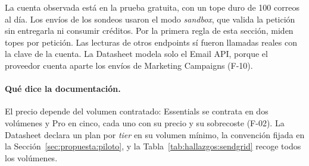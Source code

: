 La cuenta observada está en la prueba gratuita, con un tope duro de 100
correos al día. Los envíos de los sondeos usaron el modo \textit{sandbox}, que
valida la petición sin entregarla ni consumir créditos. Por la primera regla
de esta sección, miden topes por petición. Las lecturas de otros endpoints sí fueron
llamadas reales con la clave de la cuenta. La Datasheet modela solo el Email
API, porque el proveedor cuenta aparte los envíos de Marketing Campaigns
(F-10).

\paragraph{Qué dice la documentación.} El precio depende del volumen
contratado: Essentials se contrata en dos volúmenes y Pro en cinco, cada uno
con su precio y su sobrecoste (F-02). La Datasheet declara un plan por
\textit{tier} en su volumen mínimo, la convención fijada en la
Sección~\ref{sec:propuesta:piloto}, y la Tabla~\ref{tab:hallazgos:sendgrid}
recoge todos los volúmenes.

